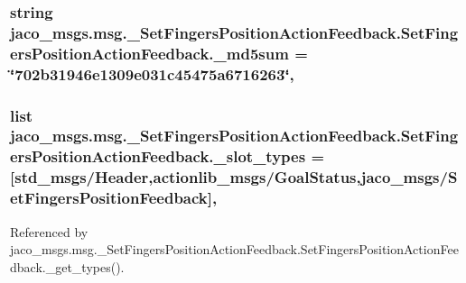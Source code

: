 \subsubsection[{\texorpdfstring{\+\_\+md5sum}{_md5sum}}]{\setlength{\rightskip}{0pt plus 5cm}string jaco\+\_\+msgs.\+msg.\+\_\+\+Set\+Fingers\+Position\+Action\+Feedback.\+Set\+Fingers\+Position\+Action\+Feedback.\+\_\+md5sum = \char`\"{}702b31946e1309e031c45475a6716263\char`\"{}\hspace{0.3cm}{\ttfamily [static]}, {\ttfamily [private]}}\hypertarget{classjaco__msgs_1_1msg_1_1__SetFingersPositionActionFeedback_1_1SetFingersPositionActionFeedback_a752afedeae87be9888ffa12de761da73}{}\label{classjaco__msgs_1_1msg_1_1__SetFingersPositionActionFeedback_1_1SetFingersPositionActionFeedback_a752afedeae87be9888ffa12de761da73}
\subsubsection[{\texorpdfstring{\+\_\+slot\+\_\+types}{_slot_types}}]{\setlength{\rightskip}{0pt plus 5cm}list jaco\+\_\+msgs.\+msg.\+\_\+\+Set\+Fingers\+Position\+Action\+Feedback.\+Set\+Fingers\+Position\+Action\+Feedback.\+\_\+slot\+\_\+types = \mbox{[}\textquotesingle{}std\+\_\+msgs/Header\textquotesingle{},\textquotesingle{}actionlib\+\_\+msgs/Goal\+Status\textquotesingle{},\textquotesingle{}jaco\+\_\+msgs/{\bf Set\+Fingers\+Position\+Feedback}\textquotesingle{}\mbox{]}\hspace{0.3cm}{\ttfamily [static]}, {\ttfamily [private]}}\hypertarget{classjaco__msgs_1_1msg_1_1__SetFingersPositionActionFeedback_1_1SetFingersPositionActionFeedback_ab7d26cf37b2389bd5aeee2a36341e61f}{}\label{classjaco__msgs_1_1msg_1_1__SetFingersPositionActionFeedback_1_1SetFingersPositionActionFeedback_ab7d26cf37b2389bd5aeee2a36341e61f}


Referenced by jaco\+\_\+msgs.\+msg.\+\_\+\+Set\+Fingers\+Position\+Action\+Feedback.\+Set\+Fingers\+Position\+Action\+Feedback.\+\_\+get\+\_\+types().

